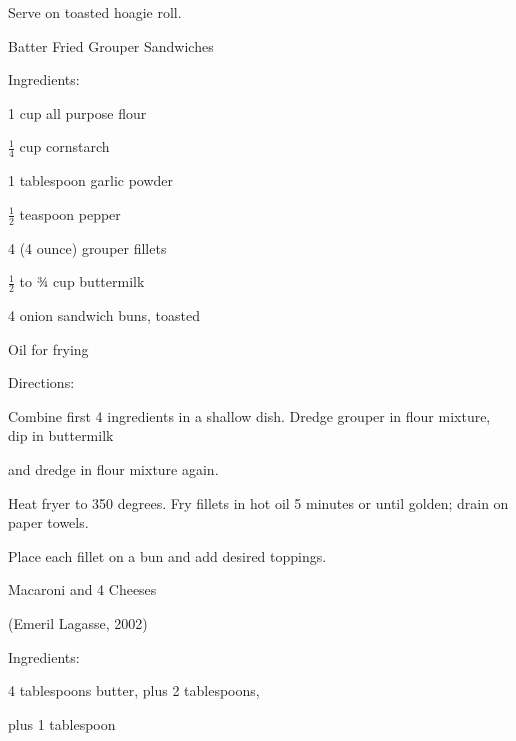 \documentclass[a4paper,portrait,12pt]{book}
\begin{document}
Serve on toasted hoagie roll.







\newpage
Batter Fried Grouper Sandwiches




Ingredients:




1 cup all purpose flour




$\frac{1}{4}$ cup cornstarch




1 tablespoon garlic powder




$\frac{1}{2}$ teaspoon pepper




4 (4 ounce) grouper fillets




$\frac{1}{2}$ to ¾ cup buttermilk




4 onion sandwich buns, toasted




Oil for frying




Directions:




Combine first 4 ingredients in a shallow dish. Dredge grouper in flour mixture, dip in buttermilk




and dredge in flour mixture again.




Heat fryer to 350 degrees. Fry fillets in hot oil 5 minutes or until golden; drain on paper towels.




Place each fillet on a bun and add desired toppings.







\newpage
Macaroni and 4 Cheeses




(Emeril Lagasse, 2002)




Ingredients:




4 tablespoons butter, plus 2 tablespoons,




plus 1 tablespoon
\end{document}
